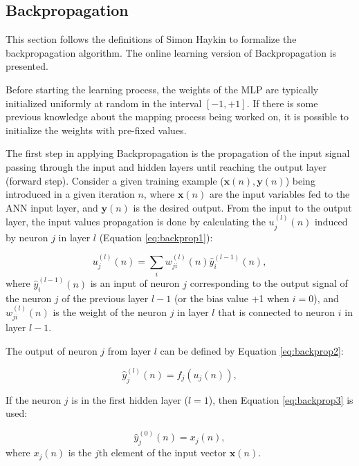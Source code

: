 \subsection{Backpropagation}
\label{ssec:Pseudocodigo}

This section follows the definitions of Simon Haykin \cite{haykin} to formalize the backpropagation algorithm. The online learning version of Backpropagation is presented.

Before starting the learning process, the weights of the MLP are typically initialized uniformly at random in the interval $[-1,+1]$. If there is some previous knowledge about the mapping process being worked on, it is possible to initialize the weights with pre-fixed values.  

The first step in applying Backpropagation is the propagation of the input signal passing through the input and hidden layers until reaching the output layer (forward step). 
Consider a given training example ($\mathbf{x}(n), \mathbf{y}(n)$) being introduced in a given iteration $n$, where $\mathbf{x}(n)$ are the input variables fed to the ANN input layer, and $\mathbf{y}(n)$ is the desired output. From the input to the output layer, the input values propagation is done by calculating the $u_j^{(l)}(n)$  induced by neuron $j$ in layer $l$ (Equation \ref{eq:backprop1}):


\begin{equation}
\label{eq:backprop1}
    u_j^{(l)}(n) = \sum_i w_{ji}^{(l)}(n) \hat{y}_i^{(l-1)}(n),
\end{equation}
where $\hat{y}_i^{(l-1)}(n)$ is an input of neuron $j$ corresponding to the output signal of the neuron $j$ of the previous layer $l-1$ (or the bias value +1 when $i=0$), and $w_{ji}^{(l)}(n)$ is the weight of the neuron $j$ in layer $l$ that is connected to neuron $i$ in layer $l-1$.

The output of neuron $j$ from layer $l$ can be defined by Equation \ref{eq:backprop2}:

\begin{equation}
\label{eq:backprop2}
    \hat{y}_j^{(l)}(n) = f_j (u_j (n) ),
\end{equation}

If the neuron $j$ is in the first hidden layer ($l = 1$), then Equation \ref{eq:backprop3} is used:

\begin{equation}
    \label{eq:backprop3}
    \hat{y}_j^{(0)}(n) = x_j (n),
\end{equation}
where $x_j(n)$ is the $j$th element of the input vector $\mathbf{x}(n)$. 

